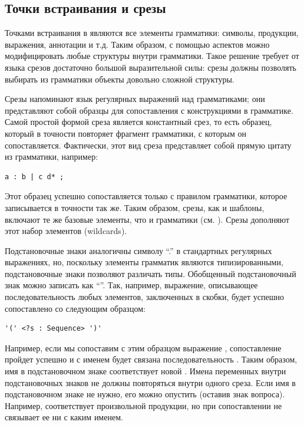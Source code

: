 \subsection{Точки встраивания и срезы}

Точками встраивания в  являются все элементы грамматики: символы, продукции, выражения, аннотации и т.д. Таким образом, с помощью аспектов можно модифицировать любые структуры внутри грамматики. Такое решение требует от языка срезов достаточно большой выразительной силы: срезы должны позволять выбирать из грамматики объекты довольно сложной структуры.

Срезы напоминают язык регулярных выражений над грамматиками; они представляют собой образцы для сопоставления с конструкциями в грамматике. Самой простой формой среза является константный срез, то есть образец, который в точности повторяет фрагмент грамматики, с которым он сопоставляется. Фактически, этот вид среза представляет собой прямую цитату из грамматики, например:
\begin{lstlisting}
a : b | c d* ;
\end{lstlisting}
Этот образец успешно сопоставляется только с правилом грамматики, которое записывается в точности так же. Таким образом, срезы, как и шаблоны, включают те же базовые элементы, что и грамматики (см. ). Срезы дополняют этот набор элементов  (wildcards).

Подстановочные знаки аналогичны символу ``.'' в стандартных регулярных выражениях, но, поскольку элементы грамматик являются типизированными, подстановочные знаки позволяют различать типы. Обобщенный подстановочный знак можно записать как ``''. Так, например, выражение, описывающее последовательность любых элементов, заключенных в скобки, будет успешно сопоставлено со следующим образцом:
\begin{lstlisting}
'(' <?s : Sequence> ')'
\end{lstlisting}
Например, если мы сопоставим с этим образцом выражение , сопоставление пройдет успешно и с именем  будет связана последовательность . Таким образом, имя в подстановочном знаке соответствует новой . Имена переменных внутри подстановочных знаков не должны повторяться внутри одного среза. Если имя в подстановочном знаке не нужно, его можно опустить (оставив знак вопроса). Например,  соответствует произвольной продукции, но при сопоставлении не связывает ее ни с каким именем.

